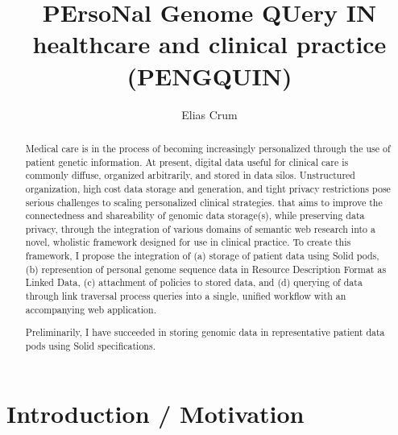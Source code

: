 \documentclass[runningheads]{llncs}
\begin{document}
\title{PErsoNal Genome QUery IN healthcare and clinical practice (PENGQUIN)}

\author{Elias Crum}



\maketitle

\begin{abstract}
	Medical care is in the process of becoming increasingly personalized through the use of patient genetic information. 
	At present, digital data useful for clinical care is commonly diffuse, organized arbitrarily, and stored in data silos. 
  Unstructured organization, high cost data storage and generation, and tight privacy restrictions pose serious challenges to scaling personalized clinical strategies.
   that aims to improve the connectedness and shareability of genomic data storage(s), while preserving data privacy, through the integration of various domains of semantic web research into a novel, wholistic framework designed for use in clinical practice. 
	To create this framework, I propose the integration of (a) storage of patient data using Solid pods, (b) represention of personal genome sequence data in Resource Description Format as Linked Data, (c) attachment of policies to stored data, and (d) querying of data through link traversal process queries into a single, unified workflow with an accompanying web application.

	Preliminarily, I have succeeded in storing genomic data in representative patient data pods using Solid specifications. 



\end{abstract}


\section{Introduction / Motivation}

\end{document}
